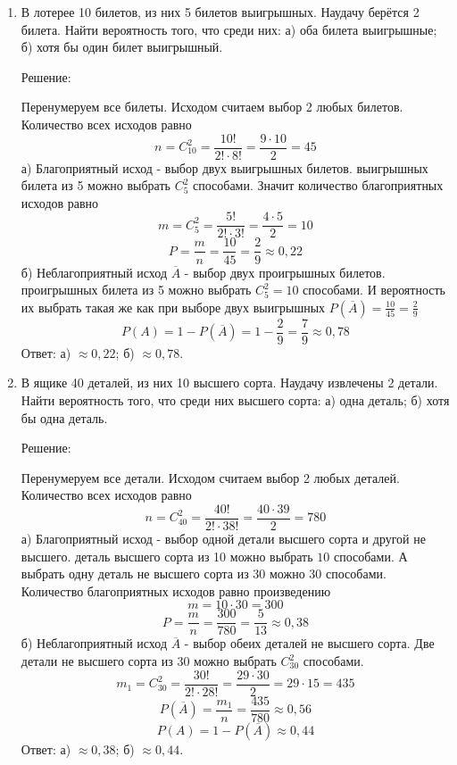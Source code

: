 \documentclass{article}
\begin{document}
\begin{enumerate}

\item %
В лотерее 10 билетов, из них 5 билетов выигрышных. Наудачу берётся 2 билета. Найти вероятность того, что среди них: а) оба билета выигрышные; б) хотя бы один билет выигрышный.
\begin{center}Решение:\end{center}
Перенумеруем все билеты. Исходом считаем выбор 2 любых билетов.
Количество всех исходов равно
$$n=C_{10}^{2}=\frac{10!}{2!\cdot8!}=\frac{9\cdot10}{2}=45$$
а) Благоприятный исход - выбор двух выигрышных билетов.  выигрышных билета из 5 можно выбрать $C_{5}^{2}$ способами. \newline
Значит количество благоприятных исходов равно
$$m=C_{5}^{2}=\frac{5!}{2!\cdot3!}=\frac{4\cdot5}{2}=10$$
$$P=\frac{m}{n}=\frac{10}{45}=\frac{2}{9}\approx0,22$$
б) Неблагоприятный исход $\overline{A}$ - выбор двух проигрышных билетов.   проигрышных билета из 5 можно выбрать $C_{5}^{2}=10$ способами. И вероятность их выбрать такая же как при выборе двух выигрышных $P(\overline{A})=\frac{10}{45}=\frac{2}{9}$ \newline
$$P(A)=1-P(\overline{A})=1-\frac{2}{9}=\frac{7}{9}\approx0,78$$
Ответ: а) $\approx0,22$; б) $\approx0,78$.

\item %
В ящике 40 деталей, из них 10 высшего сорта. Наудачу извлечены 2 детали. Найти вероятность того, что среди них высшего сорта: а) одна деталь; б) хотя бы одна деталь.
\begin{center}Решение:\end{center}
Перенумеруем все детали. Исходом считаем выбор 2 любых деталей.
Количество всех исходов равно
$$n=C_{40}^{2}=\frac{40!}{2!\cdot38!}=\frac{40\cdot39}{2}=780$$
а) Благоприятный исход - выбор одной детали высшего сорта и другой не высшего.  деталь высшего сорта из 10 можно выбрать $10$ способами. А выбрать одну деталь не высшего сорта из 30 можно $30$ способами. \newline
Количество благоприятных исходов равно произведению
$$m=10\cdot30=300$$
$$P=\frac{m}{n}=\frac{300}{780}=\frac{5}{13}\approx0,38$$
б) Неблагоприятный исход $\overline{A}$ - выбор обеих деталей не высшего сорта.
Две детали не высшего сорта из 30 можно выбрать $C_{30}^{2}$ способами.
$$m_1=C_{30}^{2}=\frac{30!}{2!\cdot28!}=\frac{29\cdot30}{2}=29\cdot15=435$$
$$P(\overline{A})=\frac{m_1}{n}=\frac{435}{780}\approx0,56$$
$$P(A)=1-P(\overline{A})\approx0,44$$
Ответ: а) $\approx0,38$; б) $\approx0,44$.


\end{enumerate}
\end{document}
